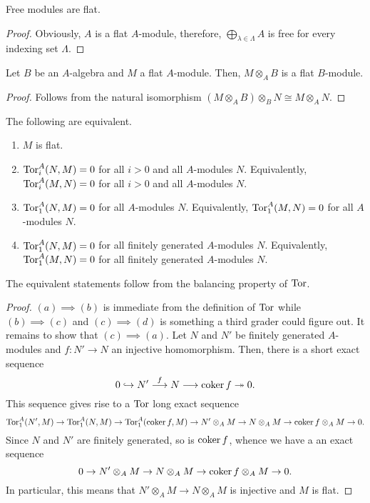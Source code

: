 \begin{corollary}
    Free modules are flat.
\end{corollary}
\begin{proof}
    Obviously, $A$ is a flat $A$-module, therefore, $\bigoplus_{\lambda\in\Lambda}A$ is free for every indexing set $\Lambda$.
\end{proof}

\begin{proposition}
    Let $B$ be an $A$-algebra and $M$ a flat $A$-module. Then, $M\otimes_A B$ is a flat $B$-module.
\end{proposition}
\begin{proof}
    Follows from the natural isomorphism $(M\otimes_A B)\otimes_B N\cong M\otimes_A N$.
\end{proof}

\begin{lemma}
    The following are equivalent.
    \begin{enumerate}[label=(\alph*)]
        \item $M$ is flat. 
        \item $\operatorname{Tor}_i^A(N, M) = 0$ for all $i > 0$ and all $A$-modules $N$. Equivalently, $\operatorname{Tor}_i^A(M, N) = 0$ for all $i > 0$ and all $A$-modules $N$.
        \item $\operatorname{Tor}^A_1(N, M) = 0$ for all $A$-modules $N$. Equivalently, $\operatorname{Tor}_1^A(M, N) = 0$ for all $A$-modules $N$.
        \item $\operatorname{Tor}^A_1(N, M) = 0$ for all finitely generated $A$-modules $N$. Equivalently, $\operatorname{Tor}^A_1(M, N) = 0$ for all finitely generated $A$-modules $N$.
    \end{enumerate}

    The equivalent statements follow from the balancing property of $\operatorname{Tor}$.
\end{lemma}
\begin{proof}
    $(a)\implies(b)$ is immediate from the definition of $\operatorname{Tor}$ while $(b)\implies(c)$ and $(c)\implies(d)$ is something a third grader could figure out. It remains to show that $(c)\implies(a)$. Let $N$ and $N'$ be finitely generated $A$-modules and $f: N'\to N$ an injective homomorphism. Then, there is a short exact sequence 
    \begin{equation*}
        0\hookrightarrow N'\stackrel{f}{\longrightarrow}N\longrightarrow \operatorname{coker} f\twoheadrightarrow 0.
    \end{equation*}
    This sequence gives rise to a $\operatorname{Tor}$ long exact sequence 
    \begin{equation*}
        \operatorname{Tor}^A_1(N', M)\to\operatorname{Tor}^A_1(N, M)\to\operatorname{Tor}^A_1(\operatorname{coker} f, M)\to N'\otimes_A M\to N\otimes_A M\to \operatorname{coker} f\otimes_A M\to 0.
    \end{equation*}
    Since $N$ and $N'$ are finitely generated, so is $\operatorname{coker} f$, whence we have a an exact sequence 
    \begin{equation*}
        0\to N'\otimes_A M\to N\otimes_A M\to \operatorname{coker} f\otimes_A M\to 0.
    \end{equation*}
    In particular, this means that $N'\otimes_A M\to N\otimes_A M$ is injective and $M$ is flat.
\end{proof}

